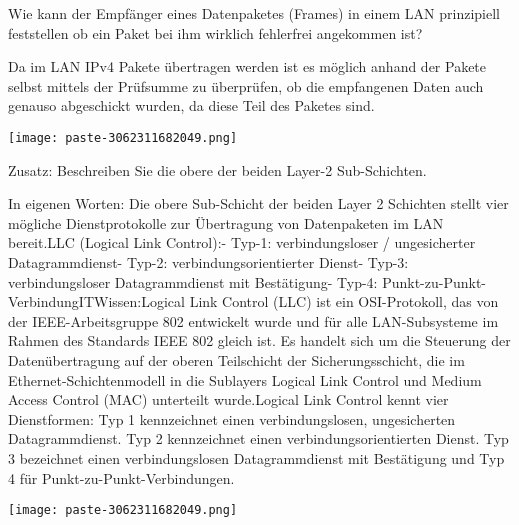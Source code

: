 \documentclass{article}
\begin{document}
\begin{tcolorbox}[colback=white!10!white,colframe=lightgray!75!black,
  savelowerto=\jobname_ex.tex,breakable,enhanced,lines before break=40]

\justifying
Wie kann der Empfänger eines Datenpaketes (Frames) in einem LAN prinzipiell feststellen ob ein Paket bei ihm wirklich fehlerfrei angekommen ist?

\tcblower

\justifying
Da im LAN IPv4 Pakete übertragen werden ist es möglich anhand der Pakete selbst mittels der Prüfsumme zu überprüfen, ob die empfangenen Daten auch genauso abgeschickt wurden, da diese Teil des Paketes sind.\begin{center}
\texttt{[image: paste-3062311682049.png]}
\end{center}

\end{tcolorbox}
\begin{tcolorbox}[colback=white!10!white,colframe=lightgray!75!black,
  savelowerto=\jobname_ex.tex,breakable,enhanced,lines before break=40]

\justifying
Zusatz: Beschreiben Sie die obere der beiden Layer-2 Sub-Schichten.

\tcblower

\justifying
In eigenen Worten: Die obere Sub-Schicht der beiden Layer 2 Schichten stellt vier mögliche Dienstprotokolle zur Übertragung von Datenpaketen im LAN bereit.LLC (Logical Link Control):- Typ-1: verbindungsloser / ungesicherter Datagrammdienst- Typ-2: verbindungsorientierter Dienst- Typ-3: verbindungsloser Datagrammdienst mit Bestätigung- Typ-4: Punkt-zu-Punkt-VerbindungITWissen:Logical Link Control (LLC) ist ein OSI-Protokoll, das von der IEEE-Arbeitsgruppe 802 entwickelt wurde und für alle LAN-Subsysteme im Rahmen des Standards IEEE 802 gleich ist. Es handelt sich um die Steuerung der Datenübertragung auf der oberen Teilschicht der Sicherungsschicht, die im Ethernet-Schichtenmodell in die Sublayers Logical Link Control und Medium Access Control (MAC) unterteilt wurde.Logical Link Control kennt vier Dienstformen: Typ 1 kennzeichnet einen verbindungslosen, ungesicherten Datagrammdienst. Typ 2 kennzeichnet einen verbindungsorientierten Dienst. Typ 3 bezeichnet einen verbindungslosen Datagrammdienst mit Bestätigung und Typ 4 für Punkt-zu-Punkt-Verbindungen.\begin{center}
\texttt{[image: paste-3062311682049.png]}
\end{center}

\end{tcolorbox}
\end{document}
